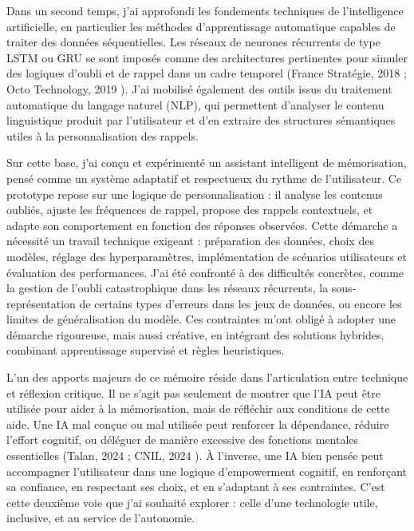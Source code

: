 \documentclass[11pt,a4paper]{report}
\begin{document}
Dans un second temps, j’ai approfondi les fondements techniques de l’intelligence artificielle, en particulier les méthodes d’apprentissage automatique capables de traiter des données séquentielles. Les réseaux de neurones récurrents de type LSTM ou GRU se sont imposés comme des architectures pertinentes pour simuler des logiques d’oubli et de rappel dans un cadre temporel (France Stratégie, 2018 \cite{francestrategie} ; Octo Technology, 2019 \cite{octo}). J’ai mobilisé également des outils issus du traitement automatique du langage naturel (NLP), qui permettent d’analyser le contenu linguistique produit par l’utilisateur et d’en extraire des structures sémantiques utiles à la personnalisation des rappels.

Sur cette base, j’ai conçu et expérimenté un assistant intelligent de mémorisation, pensé comme un système adaptatif et respectueux du rythme de l’utilisateur. Ce prototype repose sur une logique de personnalisation : il analyse les contenus oubliés, ajuste les fréquences de rappel, propose des rappels contextuels, et adapte son comportement en fonction des réponses observées. Cette démarche a nécessité un travail technique exigeant : préparation des données, choix des modèles, réglage des hyperparamètres, implémentation de scénarios utilisateurs et évaluation des performances. J’ai été confronté à des difficultés concrètes, comme la gestion de l’oubli catastrophique dans les réseaux récurrents, la sous-représentation de certains types d’erreurs dans les jeux de données, ou encore les limites de généralisation du modèle. Ces contraintes m’ont obligé à adopter une démarche rigoureuse, mais aussi créative, en intégrant des solutions hybrides, combinant apprentissage supervisé et règles heuristiques.

L’un des apports majeurs de ce mémoire réside dans l’articulation entre technique et réflexion critique. Il ne s’agit pas seulement de montrer que l’IA peut être utilisée pour aider à la mémorisation, mais de réfléchir aux conditions de cette aide. Une IA mal conçue ou mal utilisée peut renforcer la dépendance, réduire l’effort cognitif, ou déléguer de manière excessive des fonctions mentales essentielles (Talan, 2024 \cite{talan} ; CNIL, 2024 \cite{cnil}). À l’inverse, une IA bien pensée peut accompagner l’utilisateur dans une logique d’empowerment cognitif, en renforçant sa confiance, en respectant ses choix, et en s’adaptant à ses contraintes. C’est cette deuxième voie que j’ai souhaité explorer : celle d’une technologie utile, inclusive, et au service de l’autonomie.
\end{document}
